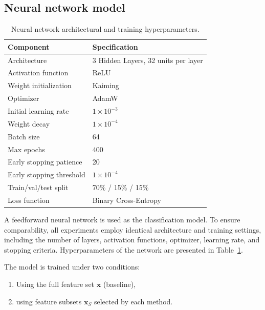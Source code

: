 \subsection{Neural network model}

\begin{table}[h!]
\centering
\begin{tabular}{ll}
\hline
\textbf{Component} & \textbf{Specification} \\ \hline

Architecture & 3 Hidden Layers, 32 units per layer \\ 
Activation function & ReLU \\ 
Weight initialization & Kaiming\\ \hline

Optimizer & AdamW \\ 
Initial learning rate & $1 \times 10^{-3}$ \\ 
Weight decay & $1 \times 10^{-4}$ \\ \hline

Batch size & 64 \\ 
Max epochs & 400 \\ 
Early stopping patience & 20 \\ 
Early stopping threshold & $1 \times 10^{-4}$ \\ 
Train/val/test split & 70\% / 15\% / 15\% \\ 
Loss function & Binary Cross-Entropy \\ \hline
\end{tabular}
\caption{Neural network architectural and training hyperparameters.}
\label{tab:nn_hyperparameters}
\end{table}

A feedforward neural network is used as the classification model. To ensure comparability, all experiments employ identical architecture and training settings, including the number of layers, activation functions, optimizer, learning rate, and stopping criteria. Hyperparameters of the network are presented in Table~\ref{tab:nn_hyperparameters}.

The model is trained under two conditions:
\begin{enumerate}
    \item Using the full feature set $\mathbf{x}$ (baseline),
    \item using feature subsets $\mathbf{x}_S$ selected by each method.
\end{enumerate}

